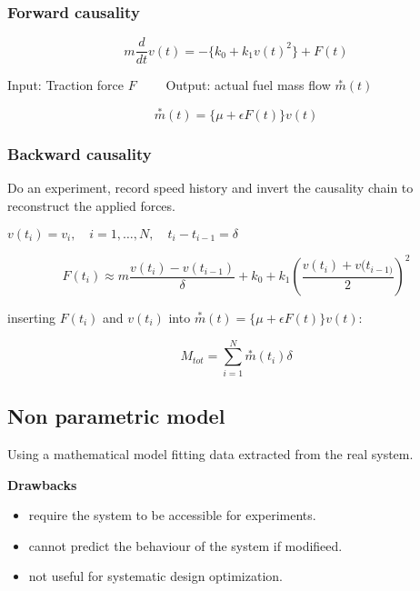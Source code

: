 \documentclass[10pt,a4paper]{scrartcl}
\begin{document}
\begin{multicols*}{3}

\subsubsection{Forward causality}


\begin{equation*}
m\frac{d}{dt}v(t)=-\{k_0+k_1v(t)^2\}+F(t)
\end{equation*}

\small
Input: Traction force $F\qquad$ Output: actual fuel mass flow $\overset{\ast}{m}(t)$\normalsize

\begin{equation*}
\overset{\ast}{m}(t)=\{\mu+\epsilon F(t)\}v(t)
\end{equation*}

\subsubsection{Backward causality}

Do an experiment, record speed history and invert the causality chain to reconstruct the applied forces.


$v(t_i)=v_i,\quad i=1,\ldots,N,\quad t_i-t_{i-1}=\delta$

\begin{equation*}F(t_i)\approx m\frac{v(t_i)-v(t_{i-1})}{\delta}+k_0+k_1\left(\frac{v(t_i)+v(t_{i-1)}}{2}\right)^2
\end{equation*}

inserting $F(t_i)$ and $v(t_i)$ into $\overset{\ast}{m}(t)=\{\mu+\epsilon F(t)\}v(t)$:

\begin{equation*}
M_{tot}=\sum\limits_{i=1}^N\overset{\ast}{m}(t_i)\delta
\end{equation*}


\subsection{Non parametric model}

Using a mathematical model fitting data extracted from the real system.

\textbf{Drawbacks}
\begin{itemize}
\item require the system to be accessible for experiments.
\item cannot predict the behaviour of the system if modifieed.
\item not useful for systematic design optimization.
\end{itemize}


\end{multicols*}
\end{document}

